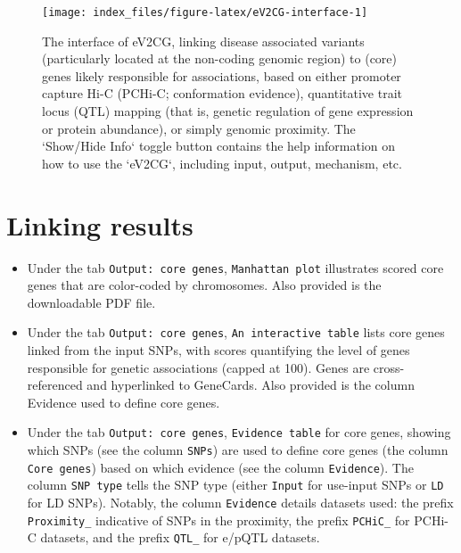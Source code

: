 \documentclass[
  oneside]{book}
\begin{document}
\begin{figure}

{\centering \texttt{[image: index\_files/figure-latex/eV2CG-interface-1]} 

}

\caption{The interface of eV2CG, linking disease associated variants (particularly located at the non-coding genomic region) to (core) genes likely responsible for associations, based on either promoter capture Hi-C (PCHi-C; conformation evidence), quantitative trait locus (QTL) mapping (that is, genetic regulation of gene expression or protein abundance), or simply genomic proximity. The `Show/Hide Info` toggle button contains the help information on how to use the `eV2CG`, including input, output, mechanism, etc.}\label{fig:eV2CG-interface}
\end{figure}

\hypertarget{linking-results}{%
\section{Linking results}\label{linking-results}}

\begin{itemize}
\item
  Under the tab \texttt{Output:\ core\ genes}, \texttt{Manhattan\ plot} illustrates scored core genes that are color-coded by chromosomes. Also provided is the downloadable PDF file.
\item
  Under the tab \texttt{Output:\ core\ genes}, \texttt{An\ interactive\ table} lists core genes linked from the input SNPs, with scores quantifying the level of genes responsible for genetic associations (capped at 100). Genes are cross-referenced and hyperlinked to GeneCards. Also provided is the column Evidence used to define core genes.
\item
  Under the tab \texttt{Output:\ core\ genes}, \texttt{Evidence\ table} for core genes, showing which SNPs (see the column \texttt{SNPs}) are used to define core genes (the column \texttt{Core\ genes}) based on which evidence (see the column \texttt{Evidence}). The column \texttt{SNP\ type} tells the SNP type (either \texttt{Input} for use-input SNPs or \texttt{LD} for LD SNPs). Notably, the column \texttt{Evidence} details datasets used: the prefix \texttt{Proximity\_} indicative of SNPs in the proximity, the prefix \texttt{PCHiC\_} for PCHi-C datasets, and the prefix \texttt{QTL\_} for e/pQTL datasets.
\end{itemize}
\end{document}
